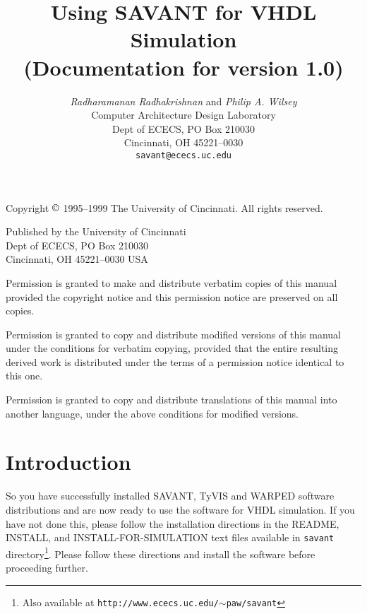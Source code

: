\documentclass[12pt]{report}
\newcommand{\version}{1.0}
\begin{document}
\title{
\textbf{Using SAVANT for VHDL Simulation} \\
(Documentation for version \version)}

\author{
\emph{Radharamanan Radhakrishnan} and \emph{Philip A.  Wilsey} \\
Computer Architecture Design Laboratory \\
Dept of ECECS, PO Box 210030 \\
Cincinnati, OH  45221--0030 \\
\texttt{savant@ececs.uc.edu}
}

\date{}

\maketitle

\vspace*{6in}

\noindent
Copyright $\copyright$ 1995--1999 The University of Cincinnati.  All
rights reserved.  

\bigskip

\noindent
Published by the University of Cincinnati \\
Dept of ECECS, PO Box 210030 \\
Cincinnati, OH  45221--0030 USA 


\noindent
Permission is granted to make and distribute verbatim copies of
this manual provided the copyright notice and this permission notice
are preserved on all copies.

\medskip
\noindent
Permission is granted to copy and distribute modified versions of this
manual under the conditions for verbatim copying, provided that the entire
resulting derived work is distributed under the terms of a permission
notice identical to this one.

\medskip
\noindent
Permission is granted to copy and distribute translations of this manual
into another language, under the above conditions for modified versions.

\newpage

\chapter{Introduction}

So you have successfully installed SAVANT, TyVIS and WARPED software
distributions and are now ready to use the software for VHDL
simulation. If you have not done this, please follow the installation
directions in the \textsf{README}, \textsf{INSTALL}, and
\textsf{INSTALL-FOR-SIMULATION} text files available in \texttt{savant}
directory\footnote{Also available at
\texttt{http://www.ececs.uc.edu/$\sim$paw/savant}}. Please follow these 
directions and install the software before proceeding further.
\end{document}
